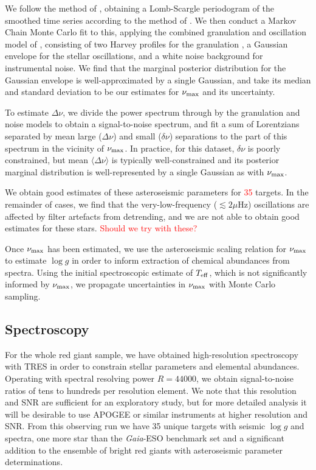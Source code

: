 \documentclass[a4paper,fleqn,usenatbib]{mnras}
\newcommand{\numax}{\mbox{$\nu_{\rm max}$}\xspace}
\newcommand{\Dnu}{\mbox{$\Delta \nu$}\xspace}
\newcommand{\dnu}{\mbox{$\delta \nu$}\xspace}
\newcommand{\muHz}{\mbox{$\mu$Hz}\xspace}
\newcommand{\teff}{\mbox{$T_{\rm eff}$}\xspace}
\newcommand{\logg}{\mbox{$\log g$}\xspace}
\newcommand{\gaia}{\emph{Gaia}\xspace}
\begin{document}
We follow the method of \citet{2016AN....337..774D}, obtaining a Lomb-Scargle periodogram of the smoothed time series according to the method of \citet{2011MNRAS.414L...6G}. We then conduct a Markov Chain Monte Carlo fit to this, applying the combined granulation and oscillation model of \citet{2014A&A...570A..41K}, consisting of two Harvey profiles for the granulation \citep{1985ESASP.235..199H}, a Gaussian envelope for the stellar oscillations, and a white noise background for instrumental noise. We find that the marginal posterior distribution for the Gaussian envelope is well-approximated by a single Gaussian, and take its median and standard deviation to be our estimates for \numax and its uncertainty.

To estimate \Dnu, we divide the power spectrum through by the granulation and noise models to obtain a signal-to-noise spectrum, and fit a sum of Lorentzians separated by mean large (\Dnu) and small (\dnu) separations to the part of this spectrum in the vicinity of \numax. In practice, for this dataset, \dnu is poorly constrained, but mean $\langle \Dnu \rangle$ is typically well-constrained and its posterior marginal distribution is well-represented by a single Gaussian as with \numax. 

We obtain good estimates of these asteroseismic parameters for \textcolor{red}{35} targets. In the remainder of cases, we find that the very-low-frequency ($\lesssim 2\muHz$) oscillations are affected by filter artefacts from detrending, and we are not able to obtain good estimates for these stars. \textcolor{red}{Should we try with these?}

Once \numax has been estimated, we use the asteroseismic scaling relation for \numax \citep[Equation~\ref{scaling};][]{KB95} to estimate \logg in order to inform extraction of chemical abundances from spectra. Using the initial spectroscopic estimate of \teff, which is not significantly informed by \numax, we propagate uncertainties in \numax with Monte Carlo sampling. 

\subsection{Spectroscopy}
\label{spectroscopy}

For the whole red giant sample, we have obtained high-resolution spectroscopy with TRES in order to constrain stellar parameters and elemental abundances. Operating with spectral resolving power $R=44 000$, we obtain signal-to-noise ratios of tens to hundreds per resolution element. We note that this resolution and SNR are sufficient for an exploratory study, but for more detailed analysis it will be desirable to use APOGEE or similar instruments at higher resolution and SNR. From this observing run we have 35 unique targets with seismic \logg and spectra, one more star than the \gaia-ESO benchmark set and a significant addition to the ensemble of bright red giants with asteroseismic parameter determinations. 
\end{document}
